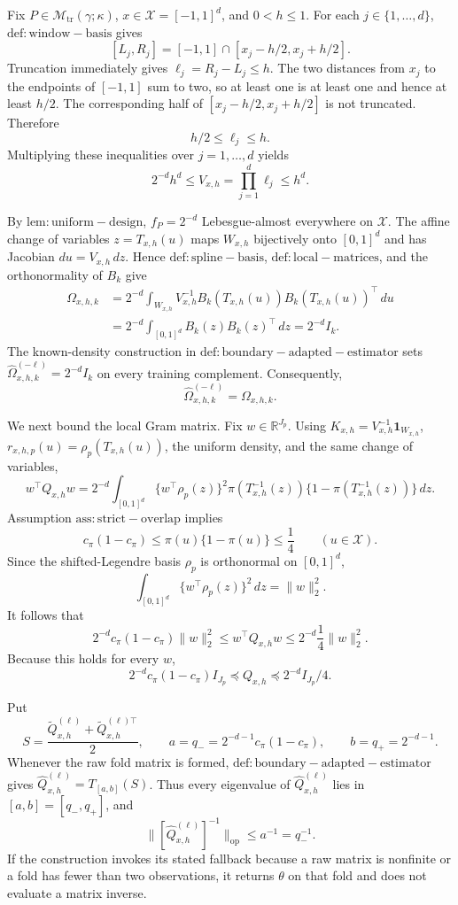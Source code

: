 Fix \(P\in\mathcal M_{\mathrm{tr}}(\gamma;\kappa)\), \(x\in\mathcal X=[-1,1]^d\), and \(0<h\le1\). For each \(j\in\{1,\ldots,d\}\), \(\mathrm{def:window-basis}\) gives
\[
[L_j,R_j]=[-1,1]\cap[x_j-h/2,x_j+h/2].
\]
Truncation immediately gives \(\ell_j=R_j-L_j\le h\). The two distances from \(x_j\) to the endpoints of \([-1,1]\) sum to two, so at least one is at least one and hence at least \(h/2\). The corresponding half of \([x_j-h/2,x_j+h/2]\) is not truncated. Therefore
\[
 h/2\le \ell_j\le h.
\]
Multiplying these inequalities over \(j=1,\ldots,d\) yields
\[
 2^{-d}h^d\le V_{x,h}=\prod_{j=1}^d\ell_j\le h^d.
\]

By \(\mathrm{lem:uniform-design}\), \(f_P=2^{-d}\) Lebesgue-almost everywhere on \(\mathcal X\). The affine change of variables \(z=T_{x,h}(u)\) maps \(W_{x,h}\) bijectively onto \([0,1]^d\) and has Jacobian \(du=V_{x,h}\,dz\). Hence \(\mathrm{def:spline-basis}\), \(\mathrm{def:local-matrices}\), and the orthonormality of \(B_k\) give
\[
\begin{aligned}
\Omega_{x,h,k}
&=2^{-d}\int_{W_{x,h}}V_{x,h}^{-1}B_k(T_{x,h}(u))B_k(T_{x,h}(u))^\top\,du\\
&=2^{-d}\int_{[0,1]^d}B_k(z)B_k(z)^\top\,dz
 =2^{-d}I_k.
\end{aligned}
\]
The known-density construction in \(\mathrm{def:boundary-adapted-estimator}\) sets \(\widehat\Omega^{(-\ell)}_{x,h,k}=2^{-d}I_k\) on every training complement. Consequently,
\[
 \widehat\Omega^{(-\ell)}_{x,h,k}=\Omega_{x,h,k}.
\]

We next bound the local Gram matrix. Fix \(w\in\mathbb R^{J_p}\). Using \(K_{x,h}=V_{x,h}^{-1}\mathbf 1_{W_{x,h}}\), \(r_{x,h,p}(u)=\rho_p(T_{x,h}(u))\), the uniform density, and the same change of variables,
\[
 w^\top Q_{x,h}w
 =2^{-d}\int_{[0,1]^d}
 \{w^\top\rho_p(z)\}^2
 \pi(T_{x,h}^{-1}(z))\{1-\pi(T_{x,h}^{-1}(z))\}\,dz.
\]
Assumption \(\mathrm{ass:strict-overlap}\) implies
\[
 c_\pi(1-c_\pi)
 \le \pi(u)\{1-\pi(u)\}
 \le \frac14
 \qquad(u\in\mathcal X).
\]
Since the shifted-Legendre basis \(\rho_p\) is orthonormal on \([0,1]^d\),
\[
 \int_{[0,1]^d}\{w^\top\rho_p(z)\}^2\,dz=\lVert w\rVert_2^2.
\]
It follows that
\[
 2^{-d}c_\pi(1-c_\pi)\lVert w\rVert_2^2
 \le w^\top Q_{x,h}w
 \le 2^{-d}\frac14\lVert w\rVert_2^2.
\]
Because this holds for every \(w\),
\[
 2^{-d}c_\pi(1-c_\pi)I_{J_p}
 \preceq Q_{x,h}
 \preceq 2^{-d}I_{J_p}/4.
\]

Put
\[
 S=\frac{\widetilde Q^{(\ell)}_{x,h}+\widetilde Q^{(\ell)\top}_{x,h}}2,
 \qquad a=q_-=2^{-d-1}c_\pi(1-c_\pi),
 \qquad b=q_+=2^{-d-1}.
\]
Whenever the raw fold matrix is formed, \(\mathrm{def:boundary-adapted-estimator}\) gives \(\widehat Q^{(\ell)}_{x,h}=T_{[a,b]}(S)\). Thus every eigenvalue of \(\widehat Q^{(\ell)}_{x,h}\) lies in \([a,b]=[q_-,q_+]\), and
\[
 \bigl\lVert[\widehat Q^{(\ell)}_{x,h}]^{-1}\bigr\rVert_{\mathrm{op}}
 \le a^{-1}=q_-^{-1}.
\]
If the construction invokes its stated fallback because a raw matrix is nonfinite or a fold has fewer than two observations, it returns \(\theta\) on that fold and does not evaluate a matrix inverse.

